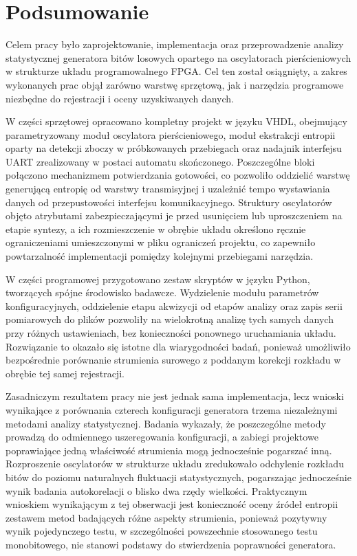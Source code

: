 \chapter{Podsumowanie}

Celem pracy było zaprojektowanie, implementacja oraz przeprowadzenie analizy statystycznej
generatora bitów losowych opartego na oscylatorach pierścieniowych w strukturze układu
programowalnego FPGA. Cel ten został osiągnięty, a zakres wykonanych prac objął zarówno
warstwę sprzętową, jak i narzędzia programowe niezbędne do rejestracji i oceny
uzyskiwanych danych.

W części sprzętowej opracowano kompletny projekt w języku VHDL, obejmujący
parametryzowany moduł oscylatora pierścieniowego, moduł ekstrakcji entropii oparty na
detekcji zboczy w próbkowanych przebiegach oraz nadajnik interfejsu UART zrealizowany
w postaci automatu skończonego. Poszczególne bloki połączono mechanizmem potwierdzania
gotowości, co pozwoliło oddzielić warstwę generującą entropię od warstwy transmisyjnej
i uzależnić tempo wystawiania danych od przepustowości interfejsu komunikacyjnego.
Struktury oscylatorów objęto atrybutami zabezpieczającymi je przed usunięciem lub
uproszczeniem na etapie syntezy, a ich rozmieszczenie w obrębie układu określono ręcznie
ograniczeniami umieszczonymi w pliku ograniczeń projektu, co zapewniło powtarzalność
implementacji pomiędzy kolejnymi przebiegami narzędzia.

W części programowej przygotowano zestaw skryptów w języku Python, tworzących spójne
środowisko badawcze. Wydzielenie modułu parametrów konfiguracyjnych, oddzielenie etapu
akwizycji od etapów analizy oraz zapis serii pomiarowych do plików pozwoliły na
wielokrotną analizę tych samych danych przy różnych ustawieniach, bez konieczności
ponownego uruchamiania układu. Rozwiązanie to okazało się istotne dla wiarygodności
badań, ponieważ umożliwiło bezpośrednie porównanie strumienia surowego z poddanym
korekcji rozkładu w obrębie tej samej rejestracji.

Zasadniczym rezultatem pracy nie jest jednak sama implementacja, lecz wnioski wynikające
z porównania czterech konfiguracji generatora trzema niezależnymi metodami analizy
statystycznej. Badania wykazały, że poszczególne metody prowadzą do odmiennego
uszeregowania konfiguracji, a zabiegi projektowe poprawiające jedną właściwość strumienia
mogą jednocześnie pogarszać inną. Rozproszenie oscylatorów w strukturze układu
zredukowało odchylenie rozkładu bitów do poziomu naturalnych fluktuacji statystycznych,
pogarszając jednocześnie wynik badania autokorelacji o blisko dwa rzędy wielkości.
Praktycznym wnioskiem wynikającym z tej obserwacji jest konieczność oceny źródeł entropii
zestawem metod badających różne aspekty strumienia, ponieważ pozytywny wynik pojedynczego
testu, w szczególności powszechnie stosowanego testu monobitowego, nie stanowi podstawy
do stwierdzenia poprawności generatora.

